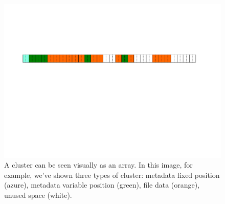 \begin{figure}[!htp]
    \centering
    \includegraphics[width=\textwidth]{img/files-1.pdf}
    \caption{A cluster can be seen visually as an array. In this image, for example, we've shown three types of cluster: metadata fixed position (azure), metadata variable position (green), file data (orange), unused space (white).}
\end{figure}

\newpage

